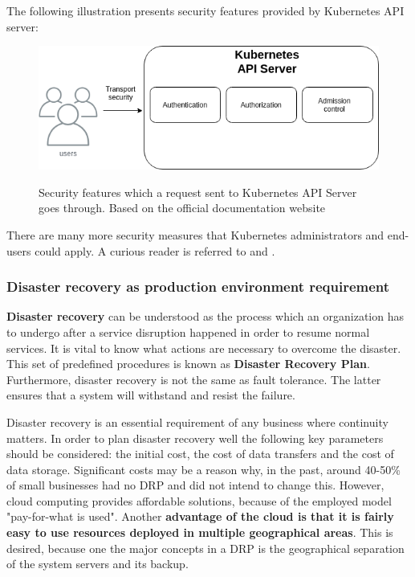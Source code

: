 The following illustration presents security features provided by Kubernetes API server:
\begin{figure}[H]
    \centering
    \includegraphics[width=13cm]{figures/api-server-security.png}
    \label{fig:security-api-server}
    \caption{Security features which a request sent to Kubernetes API Server goes through. Based on the official documentation website\cite{k8s-sec}}
\end{figure}

There are many more security measures that Kubernetes administrators and end-users could apply. A curious reader is referred to\cite{book-cndwk} and \cite{book-mastering-k8s}.

\subsubsection{Disaster recovery as production environment requirement}
\textbf{Disaster recovery} can be understood as the process which an organization has to undergo after a service  disruption happened in order to resume normal services. It is vital to know what actions are necessary to overcome the disaster. This set of predefined procedures is known as \textbf{Disaster Recovery Plan}. Furthermore, disaster recovery is not the same as fault tolerance. The latter ensures that a system will withstand and resist the failure\cite{article-dr}.

Disaster recovery is an essential requirement of any business where continuity matters. In order to plan disaster recovery well the following key parameters should be considered: the initial cost, the cost of data transfers and the cost of data storage. Significant costs may be a reason why, in the past, around 40-50\% of small businesses had no DRP and did not intend to change this. However, cloud computing provides affordable solutions, because of the employed model "pay-for-what is used". Another \textbf{advantage of the cloud is that it is fairly easy to use resources deployed in multiple geographical areas}. This is desired, because one the major concepts in a DRP is the geographical separation of the system servers and its backup\cite{article-dr-cloud}.

